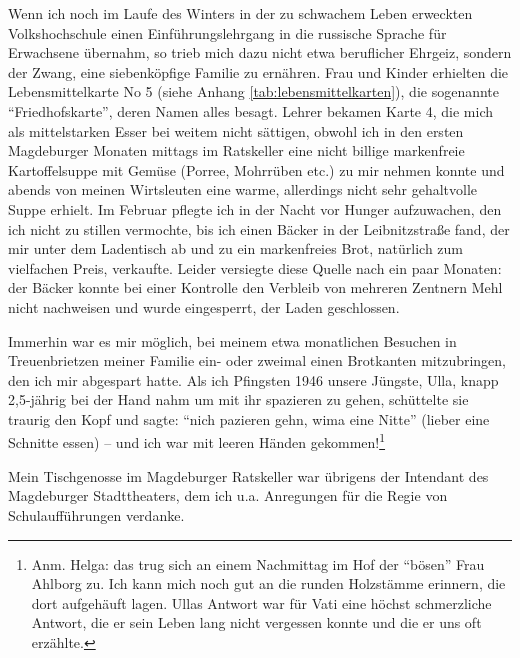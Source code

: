 Wenn ich noch im Laufe des Winters in der zu schwachem Leben erweckten Volkshochschule einen Einführungslehrgang in die russische Sprache für Erwachsene übernahm, so trieb mich dazu nicht etwa beruflicher Ehrgeiz, sondern der Zwang, eine siebenköpfige Familie zu ernähren. Frau und Kinder erhielten die Lebensmittelkarte No 5 (siehe Anhang \ref{tab:lebensmittelkarten}), die sogenannte \enquote{Friedhofskarte}, deren Namen alles besagt. Lehrer bekamen Karte 4, die mich als mittelstarken Esser bei weitem nicht sättigen, obwohl ich in den ersten Magdeburger Monaten mittags im Ratskeller eine nicht billige markenfreie Kartoffelsuppe mit Gemüse (Porree, Mohrrüben etc.) zu mir nehmen konnte und abends von meinen Wirtsleuten eine warme, allerdings nicht sehr gehaltvolle Suppe erhielt. Im Februar pflegte ich in der Nacht vor Hunger aufzuwachen, den ich nicht zu stillen vermochte,  bis ich einen Bäcker in der Leibnitzstraße fand, der mir unter dem Ladentisch ab und zu ein markenfreies Brot, natürlich zum vielfachen Preis, verkaufte. Leider versiegte diese Quelle nach ein paar Monaten: der Bäcker konnte bei einer Kontrolle den Verbleib von mehreren Zentnern Mehl nicht nachweisen und wurde eingesperrt, der Laden geschlossen.

Immerhin war es mir möglich, bei meinem etwa monatlichen Besuchen in Treuenbrietzen meiner Familie ein- oder zweimal einen Brotkanten mitzubringen, den ich mir abgespart hatte. Als ich Pfingsten 1946 unsere Jüngste, Ulla, knapp 2,5-jährig bei der Hand nahm um mit ihr spazieren zu gehen, schüttelte sie traurig den Kopf und sagte: \enquote{nich pazieren gehn, wima eine Nitte} (lieber eine Schnitte essen) -- und ich war mit leeren Händen gekommen!\footnote{Anm. Helga: das trug sich an einem Nachmittag im Hof der \enquote{bösen} Frau Ahlborg zu. Ich kann mich noch gut an die runden Holzstämme erinnern, die dort aufgehäuft lagen. Ullas Antwort war für Vati eine höchst schmerzliche Antwort, die er sein Leben lang nicht vergessen konnte und die er uns oft erzählte.}

Mein Tischgenosse im Magdeburger Ratskeller war übrigens der Intendant des Magdeburger Stadttheaters, dem ich u.a. Anregungen für die Regie von Schulaufführungen verdanke.

